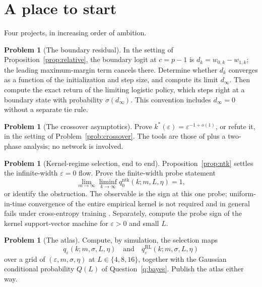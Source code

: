 \documentclass[11pt]{amsart}
\theoremstyle{plain}
\theoremstyle{definition}
\newtheorem{problem}[theorem]{Problem}
\begin{document}
\section{A place to start}\label{sec:start}

Four projects, in increasing order of ambition.

\begin{problem}[The boundary residual]\label{prob:boundary}
In the setting of Proposition~\ref{prop:relative}, the boundary logit at $c=p-1$ is $d_k=w_{0,k}-w_{1,k}$; the leading maximum-margin term cancels there. Determine whether $d_k$ converges as a function of the initialization and step size, and compute its limit $d_\infty$. Then compute the exact return of the limiting logistic policy, which steps right at a boundary state with probability $\sigma(d_\infty)$. This convention includes $d_\infty=0$ without a separate tie rule.
\end{problem}

\begin{problem}[The crossover asymptotics]
Prove $k^{*}(\varepsilon)=\varepsilon^{-1+o(1)}$, or refute it, in the setting of Problem~\ref{prob:crossover}. The tools are those of \cite{soudry2018} plus a two-phase analysis; no network is involved.
\end{problem}

\begin{problem}[Kernel-regime selection, end to end]\label{prob:ntkstarter}
Proposition~\ref{prop:ntk} settles the infinite-width $\varepsilon=0$ flow. Prove the finite-width probe statement
\[
\lim_{m\to\infty}\liminf_{k\to\infty}
q^{\mathrm{ntk}}_0(k;m,L,\eta)=1,
\]
or identify the obstruction. The observable is the sign at this one probe; uniform-in-time convergence of the entire empirical kernel is not required and in general fails under cross-entropy training \cite{yu2025}. Separately, compute the probe sign of the kernel support-vector machine for $\varepsilon>0$ and small $L$.
\end{problem}

\begin{problem}[The atlas]
Compute, by simulation, the selection maps
\[
q_\varepsilon(k;m,\sigma,L,\eta)
\quad\text{and}\quad
q^{\mathrm{RL}}_\varepsilon(k;m,\sigma,L,\eta)
\]
over a grid of $(\varepsilon,m,\sigma,\eta)$ at $L\in\{4,8,16\}$, together with the Gaussian conditional probability $Q(L)$ of Question~\ref{q:bayes}. Publish the atlas either way.
\end{problem}
\end{document}
